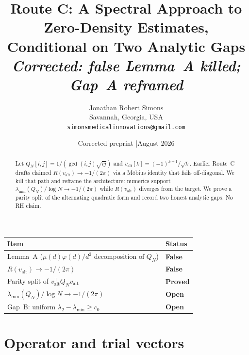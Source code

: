 \documentclass[11pt]{article}
\title{\textbf{Route C: A Spectral Approach to Zero-Density Estimates,\\
Conditional on Two Analytic Gaps}\\[4pt]
\large\textit{Corrected: false Lemma~A killed; Gap~A reframed}}
\author{Jonathan Robert Simons\\
Savannah, Georgia, USA\\
\texttt{simonsmedicalinnovations@gmail.com}}
\date{Corrected preprint \quad|\quad August 2026}
\begin{document}
\maketitle

\begin{center}
\end{center}
\vspace{0.75em}

\begin{center}
\begin{tabular}{>{\raggedright\arraybackslash}p{9cm}>{\centering\arraybackslash}p{3cm}}
\toprule
\textbf{Item} & \textbf{Status}\\
\midrule
\rowcolor{lightred}
Lemma~A ($\mu(d)\varphi(d)/d^2$ decomposition of $Q_N$) & \textcolor{killed}{\textbf{False}}\\
\rowcolor{lightred}
$R(v_{\mathrm{alt}})\to -1/(2\pi)$ & \textcolor{killed}{\textbf{False}}\\
\rowcolor{lightgreen}
Parity split of $v_{\mathrm{alt}}^\top Q_N v_{\mathrm{alt}}$ & \textcolor{proved}{\textbf{Proved}}\\
\rowcolor{lightyellow}
$\lambda_{\min}(Q_N)/\log N\to -1/(2\pi)$ & \textcolor{open}{\textbf{Open}}\\
\rowcolor{lightyellow}
Gap~B: uniform $\lambda_2-\lambda_{\min}\ge c_0$ & \textcolor{open}{\textbf{Open}}\\
\bottomrule
\end{tabular}
\end{center}

\begin{abstract}
Let $Q_N[i,j]=1/(\gcd(i,j)\sqrt{ij})$ and
$v_{\mathrm{alt}}[k]=(-1)^{k+1}/\sqrt{k}$.
Earlier Route~C drafts claimed $R(v_{\mathrm{alt}})\to -1/(2\pi)$ via a
M\"obius identity that fails off-diagonal.
We kill that path and reframe the architecture: numerics support
$\lambda_{\min}(Q_N)/\log N\to -1/(2\pi)$ while $R(v_{\mathrm{alt}})$
diverges from the target.
We prove a parity split of the alternating quadratic form and record two
honest analytic gaps. No RH claim.
\end{abstract}

\section{Operator and trial vectors}
\end{document}
